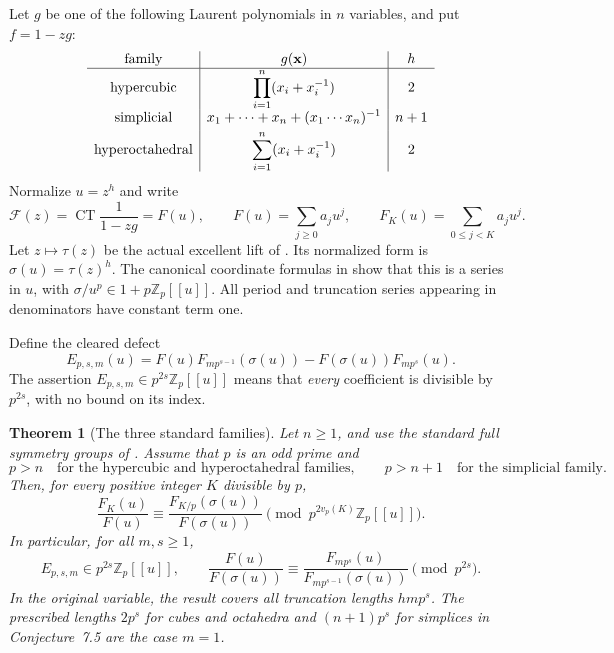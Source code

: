 \documentclass[11pt,a4paper]{article}
\newtheorem{theorem}{Theorem}[section]
\theoremstyle{definition}\newtheorem{definition}[theorem]{Definition}
\theoremstyle{remark}\newtheorem{remark}[theorem]{Remark}
\DeclareMathOperator{\CT}{CT}
\numberwithin{equation}{section}
\begin{document}
Let $g$ be one of the following Laurent polynomials in $n$ variables,
and put $f=1-zg$:
\[
\begin{array}{c|c|c}
\text{family}&g({\bf x})&h\\ \hline
\text{hypercubic}&\displaystyle\prod_{i=1}^n(x_i+x_i^{-1})&2\\[3pt]
\text{simplicial}&\displaystyle x_1+\cdots+x_n+(x_1\cdots x_n)^{-1}&n+1\\[3pt]
\text{hyperoctahedral}&\displaystyle\sum_{i=1}^n(x_i+x_i^{-1})&2
\end{array}
\]
Normalize $u=z^h$ and write
\[
 \mathcal F(z)=\CT\frac1{1-zg}=F(u),\qquad
 F(u)=\sum_{j\ge0}a_ju^j,\qquad
 F_K(u)=\sum_{0\le j<K}a_ju^j.
\]
Let $z\mapsto\tau(z)$ be the actual excellent lift of
\cite[Theorem~7.3]{BV3}. Its normalized form is
$\sigma(u)=\tau(z)^h$. The canonical coordinate formulas in
\cite[Definition~7.14 and Proposition~9.1]{BV3} show that this
is a series in $u$, with
$\sigma/u^p\in1+p\mathbb Z_p[[u]]$.
All period and truncation series appearing in denominators have
constant term one.

Define the cleared defect
\begin{equation}\label{P:eq:main-defect}
 E_{p,s,m}(u)=F(u)F_{mp^{s-1}}(\sigma(u))
                   -F(\sigma(u))F_{mp^s}(u).
\end{equation}
The assertion $E_{p,s,m}\in p^{2s}\mathbb Z_p[[u]]$ means that
\emph{every} coefficient is divisible by $p^{2s}$, with no
bound on its index.

\begin{theorem}[The three standard families]\label{P:thm:main-all}
Let $n\ge1$, and use the standard full symmetry groups of
\cite[Section~7]{BV3}. Assume that $p$ is an odd prime and
\[
 p>n\quad\text{for the hypercubic and hyperoctahedral families},
 \qquad
 p>n+1\quad\text{for the simplicial family}.
\]
Then, for every positive integer $K$ divisible by $p$,
\begin{equation}\label{P:eq:main-strong}
 \frac{F_K(u)}{F(u)}
 \equiv\frac{F_{K/p}(\sigma(u))}{F(\sigma(u))}
           \pmod{p^{2v_p(K)}\mathbb Z_p[[u]]}.
\end{equation}
In particular, for all $m,s\ge1$,
\[
 E_{p,s,m}\in p^{2s}\mathbb Z_p[[u]],\qquad
 \frac{F(u)}{F(\sigma(u))}
 \equiv\frac{F_{mp^s}(u)}{F_{mp^{s-1}}(\sigma(u))}
                       \pmod{p^{2s}}.
\]
In the original variable, the result covers all truncation lengths
$hmp^s$. The prescribed lengths $2p^s$ for cubes and octahedra
and $(n+1)p^s$ for simplices in Conjecture~7.5 are the case $m=1$.
\end{theorem}
\end{document}
